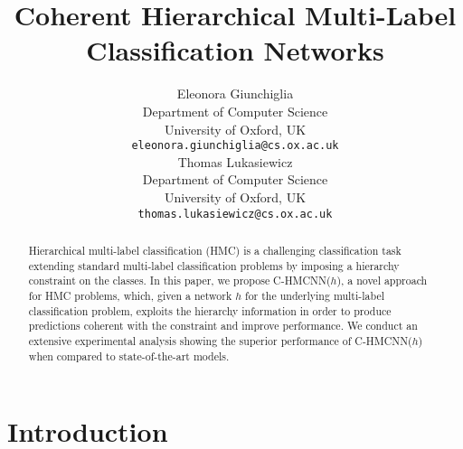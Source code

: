 \documentclass{article}
\title{Coherent Hierarchical Multi-Label\\ Classification Networks}
\author{Eleonora Giunchiglia  \\
  Department of Computer Science\\
  University of Oxford, UK\\
  \texttt{eleonora.giunchiglia@cs.ox.ac.uk} \\
   \And
   Thomas Lukasiewicz \\
   Department of Computer Science \\
   University of Oxford, UK \\
   \texttt{thomas.lukasiewicz@cs.ox.ac.uk} \\
}
\newcommand{\system}[1]{C-HMCNN(#1)}
\begin{document}
\maketitle


\begin{abstract}
Hierarchical multi-label classification (HMC) is a challenging classification task extending standard multi-label classification problems by imposing a hierarchy constraint on the classes. 
In this paper, we propose \system{$h$}, a novel approach for HMC problems, which, given a network $h$ for the underlying multi-label classification problem, exploits the hierarchy information in order to produce  predictions coherent with the constraint and improve performance. 
We conduct an extensive experimental analysis 
showing the superior performance of \system{$h$} when compared to state-of-the-art models. 

\end{abstract}



\section{Introduction}
\end{document}
